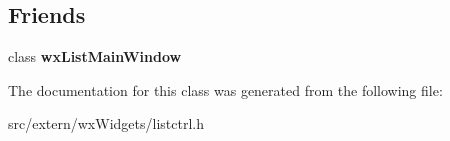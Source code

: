 \subsection*{Friends}
\begin{DoxyCompactItemize}
\item 
class {\bfseries wxListMainWindow}\label{classMuleExtern_1_1wxGenericListCtrl_a758f180ef476479575b310071bace4fe}

\end{DoxyCompactItemize}


The documentation for this class was generated from the following file:\begin{DoxyCompactItemize}
\item 
src/extern/wxWidgets/listctrl.h\end{DoxyCompactItemize}
